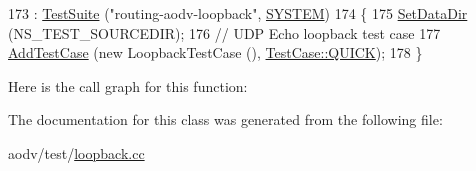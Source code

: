 \begin{DoxyCode}
173                            : \hyperlink{classns3_1_1TestSuite_a904b0c40583b744d30908aeb94636d1a}{TestSuite} (\textcolor{stringliteral}{"routing-aodv-loopback"}, \hyperlink{classns3_1_1TestSuite_a1ebfcab34ec8161e085e8e3a1855eae0a90c5529a26ab3a5ffcc6e57040dbd82e}{SYSTEM})
174   \{
175     \hyperlink{classns3_1_1TestCase_ab002fb0e5071fcde71a92ca9e8224b23}{SetDataDir} (NS\_TEST\_SOURCEDIR);
176     \textcolor{comment}{// UDP Echo loopback test case}
177     \hyperlink{classns3_1_1TestCase_a3718088e3eefd5d6454569d2e0ddd835}{AddTestCase} (\textcolor{keyword}{new} LoopbackTestCase (), \hyperlink{classns3_1_1TestCase_a11f6f57c21a0d32e605d192a89550f91ac2f47fb646e77f4ce7d662a69120965f}{TestCase::QUICK});
178   \}
\end{DoxyCode}


Here is the call graph for this function\+:




The documentation for this class was generated from the following file\+:\begin{DoxyCompactItemize}
\item 
aodv/test/\hyperlink{loopback_8cc}{loopback.\+cc}\end{DoxyCompactItemize}
